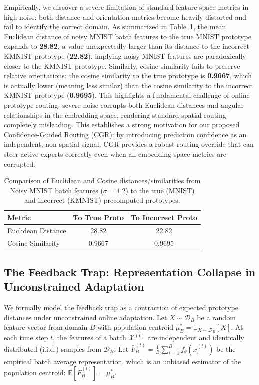 \documentclass{article}
\theoremstyle{plain}
\theoremstyle{definition}
\theoremstyle{remark}
\begin{document}
Empirically, we discover a severe limitation of standard feature-space metrics in high noise: both distance and orientation metrics become heavily distorted and fail to identify the correct domain. As summarized in Table~\ref{tab:noise_geometry}, the mean Euclidean distance of noisy MNIST batch features to the true MNIST prototype expands to \textbf{28.82}, a value unexpectedly larger than its distance to the incorrect KMNIST prototype (\textbf{22.82}), implying noisy MNIST features are paradoxically closer to the KMNIST prototype. Similarly, cosine similarity fails to preserve relative orientations: the cosine similarity to the true prototype is \textbf{0.9667}, which is actually lower (meaning less similar) than the cosine similarity to the incorrect KMNIST prototype (\textbf{0.9695}). This highlights a fundamental challenge of online prototype routing: severe noise corrupts both Euclidean distances and angular relationships in the embedding space, rendering standard spatial routing completely misleading. This establishes a strong motivation for our proposed Confidence-Guided Routing (CGR): by introducing prediction confidence as an independent, non-spatial signal, CGR provides a robust routing override that can steer active experts correctly even when all embedding-space metrics are corrupted.

\begin{table}[ht]
\caption{Comparison of Euclidean and Cosine distances/similarities from Noisy MNIST batch features ($\sigma=1.2$) to the true (MNIST) and incorrect (KMNIST) precomputed prototypes.}
\label{tab:noise_geometry}
\vskip 0.1in
\begin{center}
\begin{small}
\begin{sc}
\setlength{\tabcolsep}{3pt}
\begin{tabular}{lcc}
\toprule
Metric & To True Proto & To Incorrect Proto \\
\midrule
Euclidean Distance & 28.82 & 22.82 \\
Cosine Similarity & 0.9667 & 0.9695 \\
\bottomrule
\end{tabular}
\end{sc}
\end{small}
\end{center}
\vskip -0.1in
\end{table}

\subsection{The Feedback Trap: Representation Collapse in Unconstrained Adaptation}
We formally model the feedback trap as a contraction of expected prototype distances under unconstrained online adaptation. Let $X \sim \mathcal{D}_B$ be a random feature vector from domain $B$ with population centroid $\mu_B^* = \mathbb{E}_{X \sim \mathcal{D}_B}[X]$. At each time step $t$, the features of a batch $\mathcal{X}^{(t)}$ are independent and identically distributed (i.i.d.) samples from $\mathcal{D}_B$. 
Let $\bar{F}_B^{(t)} = \frac{1}{B}\sum_{i=1}^B f_\theta(x_i^{(t)})$ be the empirical batch average representation, which is an unbiased estimator of the population centroid: $\mathbb{E}[\bar{F}_B^{(t)}] = \mu_B^*$.
\end{document}
